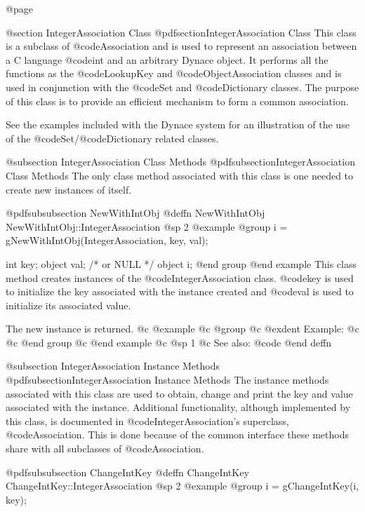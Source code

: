 @page

@section IntegerAssociation Class
@pdfsection{IntegerAssociation Class}
This class is a subclass of @code{Association} and is used to represent
an association between a C language @code{int} and an arbitrary Dynace
object.  It performs all the functions as the @code{LookupKey} and
@code{ObjectAssociation} classes and is used in conjunction with the
@code{Set} and @code{Dictionary} classes.  The purpose of this class is
to provide an efficient mechanism to form a common association.


See the examples included with the Dynace system for an illustration of the
use of the @code{Set}/@code{Dictionary} related classes.

@subsection IntegerAssociation Class Methods
@pdfsubsection{IntegerAssociation Class Methods}
The only class method associated with this class is one needed to create
new instances of itself.






@pdfsubsubsection {NewWithIntObj}
@deffn {NewWithIntObj} NewWithIntObj::IntegerAssociation
@sp 2
@example
@group
i = gNewWithIntObj(IntegerAssociation, key, val);

int     key;
object  val;    /*  or NULL   */
object  i;
@end group
@end example
This class method creates instances of the @code{IntegerAssociation}
class.  @code{key} is used to initialize the key associated with the
instance created and @code{val} is used to initialize its associated
value.

The new instance is returned.
@c @example
@c @group
@c @exdent Example:
@c 
@c @end group
@c @end example
@c @sp 1
@c See also:  @code{}
@end deffn



@subsection IntegerAssociation Instance Methods
@pdfsubsection{IntegerAssociation Instance Methods}
The instance methods associated with this class are used to obtain,
change and print the key and value associated with the instance.
Additional functionality, although implemented by this class, is documented
in @code{IntegerAssociation}'s superclass, @code{Association}.  This is done
because of the common interface these methods share with all subclasses
of @code{Association}.












@pdfsubsubsection {ChangeIntKey}
@deffn {ChangeIntKey} ChangeIntKey::IntegerAssociation
@sp 2
@example
@group
i = gChangeIntKey(i, key);

